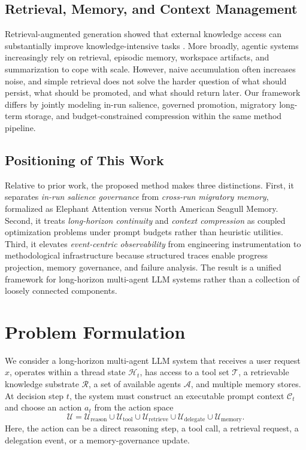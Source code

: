 \documentclass[a4paper,fleqn]{cas-sc}
\begin{document}
\subsection{Retrieval, Memory, and Context Management}

Retrieval-augmented generation showed that external knowledge access can substantially improve knowledge-intensive tasks \citep{lewis2020rag}. More broadly, agentic systems increasingly rely on retrieval, episodic memory, workspace artifacts, and summarization to cope with scale. However, naive accumulation often increases noise, and simple retrieval does not solve the harder question of what should persist, what should be promoted, and what should return later. Our framework differs by jointly modeling in-run salience, governed promotion, migratory long-term storage, and budget-constrained compression within the same method pipeline.

\subsection{Positioning of This Work}

Relative to prior work, the proposed method makes three distinctions. First, it separates \emph{in-run salience governance} from \emph{cross-run migratory memory}, formalized as Elephant Attention versus North American Seagull Memory. Second, it treats \emph{long-horizon continuity} and \emph{context compression} as coupled optimization problems under prompt budgets rather than heuristic utilities. Third, it elevates \emph{event-centric observability} from engineering instrumentation to methodological infrastructure because structured traces enable progress projection, memory governance, and failure analysis. The result is a unified framework for long-horizon multi-agent LLM systems rather than a collection of loosely connected components.

\section{Problem Formulation}

We consider a long-horizon multi-agent LLM system that receives a user request $x$, operates within a thread state $\mathcal{H}_t$, has access to a tool set $\mathcal{T}$, a retrievable knowledge substrate $\mathcal{R}$, a set of available agents $\mathcal{A}$, and multiple memory stores. At decision step $t$, the system must construct an executable prompt context $\mathcal{C}_t$ and choose an action $a_t$ from the action space
\begin{equation}
\mathcal{U} = \mathcal{U}_{\text{reason}} \cup \mathcal{U}_{\text{tool}} \cup \mathcal{U}_{\text{retrieve}} \cup \mathcal{U}_{\text{delegate}} \cup \mathcal{U}_{\text{memory}}.
\end{equation}
Here, the action can be a direct reasoning step, a tool call, a retrieval request, a delegation event, or a memory-governance update.
\end{document}
